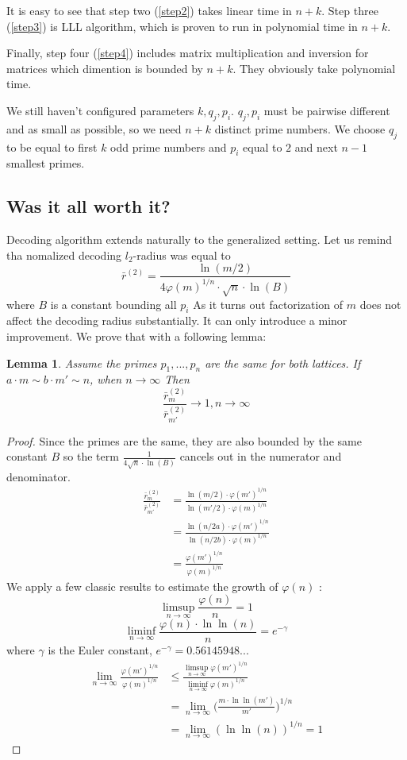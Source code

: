 \documentclass[12pt]{article}
\newtheorem{lemma}{Lemma}
\begin{document}
It is easy to see that step two (\ref{step2}) takes linear time in $n + k$. Step three (\ref{step3}) is LLL algorithm, which is proven to run in polynomial time in $n + k$.

Finally, step four (\ref{step4}) includes matrix multiplication and inversion for matrices which dimention is bounded by $n + k$. They obviously take polynomial time.

We still haven't configured parameters $k, q_{j}, p_{i}$. $q_{j}, p_{i}$ must be pairwise different and as small as possible, so we need $n+k$ distinct prime numbers. We choose $q_{j}$ to be equal to first $k$ odd prime numbers and $p_{i}$ equal to $2$ and next $n-1$ smallest primes.
\subsection{Was it all worth it?}
Decoding algorithm extends naturally to the generalized setting. Let us remind tha nomalized decoding $l_{2}$-radius was equal to
\[
    \bar r^{(2)} = \frac{\ln(m/2)}{4 \varphi(m)^{1/n} \cdot \sqrt{n} \cdot \ln(B)}
\]
where $B$ is a constant bounding all $p_{i}$
As it turns out factorization of $m$ does not affect the decoding radius substantially. It can only introduce a minor improvement. We prove that with a following lemma:

\begin{lemma}
Assume the primes $p_{1}, ..., p_{n}$ are the same for both lattices. If $a \cdot m \sim b \cdot m' \sim n$, when $n \rightarrow \infty$ Then
\[
    \frac{\bar r_{m}^{(2)}}{\bar r_{m'}^{(2)}} \rightarrow 1, n \rightarrow \infty
\]
\end{lemma}
\begin{proof}
Since the primes are the same, they are also bounded by the same constant $B$ so the term $\frac{1}{4 \sqrt{n} \cdot \ln(B)}$ cancels out in the numerator and denominator.
\[
\begin{split}
\frac{\bar r_{m}^{(2)}}{\bar r_{m'}^{(2)}}
& = \frac{\ln(m/2) \cdot \varphi(m')^{1/n}}{\ln(m'/2) \cdot \varphi(m)^{1/n}} \\
& = \frac{\ln(n/2a) \cdot \varphi(m')^{1/n}}{\ln(n/2b) \cdot \varphi(m)^{1/n}} \\
& = \frac{\varphi(m')^{1/n}}{\varphi(m)^{1/n}}
\end{split}
\]
We apply a few classic results to estimate the growth of $\varphi(n)$ \cite{[HW09]}:
\[
    \limsup\limits_{n \rightarrow \infty} \frac{\varphi(n)}{n} = 1
\]
\[
    \liminf\limits_{n \rightarrow \infty} \frac{\varphi(n) \cdot \ln\ln(n)}{n} = e^{-\gamma}
\]
where $\gamma$ is the Euler constant, $e^{-\gamma} = 0.56145948...$
\[
\begin{split}
\lim_{n \rightarrow \infty} \frac{\varphi(m')^{1/n}}{\varphi(m)^{1/n}}
& \leq \frac{\limsup\limits_{n \rightarrow \infty} \varphi(m')^{1/n}}{\liminf\limits_{n \rightarrow\infty}\varphi(m)^{1/n}} \\
& = \lim_{n \rightarrow \infty} \bigg(\frac{m \cdot \ln\ln (m')}{m'}\bigg)^{1/n} \\
& = \lim_{n \rightarrow \infty} (\ln\ln(n))^{1/n} = 1
\end{split}
\]
\end{proof}




\end{document}
